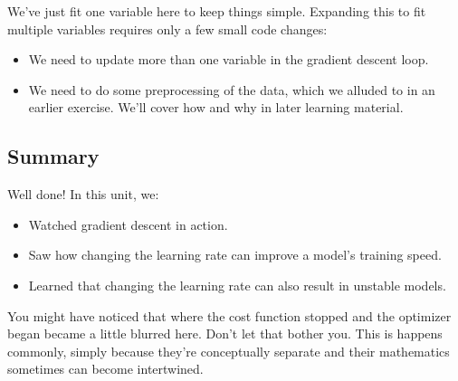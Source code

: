 \documentclass[11pt]{article}
\begin{document}
We've just fit one variable here to keep things simple. Expanding this
to fit multiple variables requires only a few small code changes:

\begin{itemize}
\item
  We need to update more than one variable in the gradient descent loop.
\item
  We need to do some preprocessing of the data, which we alluded to in
  an earlier exercise. We'll cover how and why in later learning
  material.
\end{itemize}

\hypertarget{summary}{%
\subsection{Summary}\label{summary}}

Well done! In this unit, we:

\begin{itemize}
\item
  Watched gradient descent in action.
\item
  Saw how changing the learning rate can improve a model's training
  speed.
\item
  Learned that changing the learning rate can also result in unstable
  models.
\end{itemize}

You might have noticed that where the cost function stopped and the
optimizer began became a little blurred here. Don't let that bother you.
This is happens commonly, simply because they're conceptually separate
and their mathematics sometimes can become intertwined.


    
    
    
\end{document}
